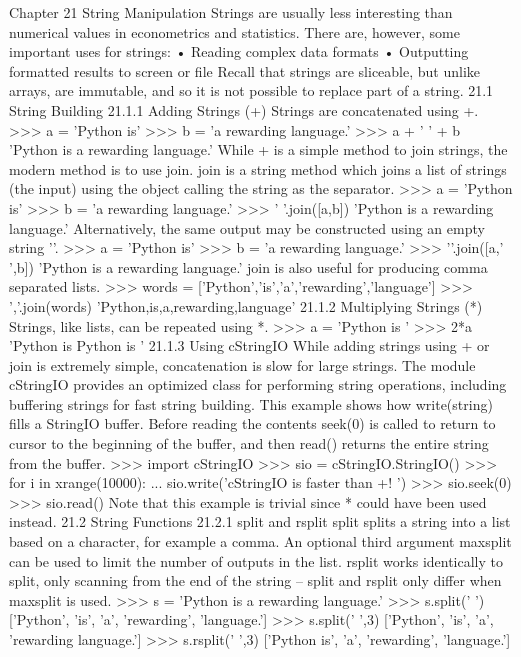 Chapter 21
String Manipulation
Strings are usually less interesting than numerical values in econometrics and statistics. There are, however,
some important uses for strings:
• Reading complex data formats
• Outputting formatted results to screen or file
Recall that strings are sliceable, but unlike arrays, are immutable, and so it is not possible to replace part
of a string.
21.1 String Building
21.1.1 Adding Strings (+)
Strings are concatenated using +.
>>> a = ’Python is’
>>> b = ’a rewarding language.’
>>> a + ’ ’ + b
’Python is a rewarding language.’
While + is a simple method to join strings, the modern method is to use join. join is a string method
which joins a list of strings (the input) using the object calling the string as the separator.
>>> a = ’Python is’
>>> b = ’a rewarding language.’
>>> ’ ’.join([a,b])
’Python is a rewarding language.’
Alternatively, the same output may be constructed using an empty string ’’.
>>> a = ’Python is’
>>> b = ’a rewarding language.’
>>> ’’.join([a,’ ’,b])
’Python is a rewarding language.’
join is also useful for producing comma separated lists.
>>> words = [’Python’,’is’,’a’,’rewarding’,’language’]
>>> ’,’.join(words)
’Python,is,a,rewarding,language’
21.1.2 Multiplying Strings (*)
Strings, like lists, can be repeated using *.
>>> a = ’Python is ’
>>> 2*a
’Python is Python is ’
21.1.3 Using cStringIO
While adding strings using + or join is extremely simple, concatenation is slow for large strings. The module
cStringIO provides an optimized class for performing string operations, including buffering strings
for fast string building. This example shows how write(string) fills a StringIO buffer. Before reading the
contents seek(0) is called to return to cursor to the beginning of the buffer, and then read() returns the
entire string from the buffer.
>>> import cStringIO
>>> sio = cStringIO.StringIO()
>>> for i in xrange(10000):
... sio.write(’cStringIO is faster than +! ’)
>>> sio.seek(0)
>>> sio.read()
Note that this example is trivial since * could have been used instead.
21.2 String Functions
21.2.1 split and rsplit
split splits a string into a list based on a character, for example a comma. An optional third argument
maxsplit can be used to limit the number of outputs in the list. rsplit works identically to split, only
scanning from the end of the string – split and rsplit only differ when maxsplit is used.
>>> s = ’Python is a rewarding language.’
>>> s.split(’ ’)
[’Python’, ’is’, ’a’, ’rewarding’, ’language.’]
>>> s.split(’ ’,3)
[’Python’, ’is’, ’a’, ’rewarding language.’]
>>> s.rsplit(’ ’,3)
[’Python is’, ’a’, ’rewarding’, ’language.’]

